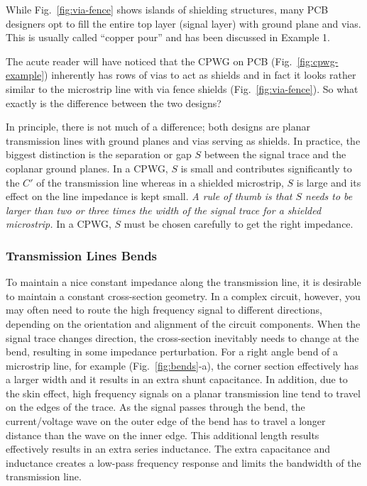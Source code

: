 \documentclass[12pt,letterpaper]{scrartcl}
\begin{document}
While Fig.~\ref{fig:via-fence} shows islands of shielding structures, many PCB designers opt to fill the entire top layer (signal layer) with ground plane and vias. This is usually called ``copper pour'' and has been discussed in Example 1. 

The acute reader will have noticed that the CPWG on PCB (Fig.~\ref{fig:cpwg-example}) inherently has rows of vias to act as shields and in fact it looks rather similar to the microstrip line with via fence shields (Fig.~\ref{fig:via-fence}). So what exactly is the difference between the two designs?

In principle, there is not much of a difference; both designs are planar transmission lines with ground planes and vias serving as shields. In practice, the biggest distinction is the separation or gap $S$ between the signal trace and the coplanar ground planes. In a CPWG, $S$ is small and contributes significantly to the $C'$ of the transmission line whereas in a shielded microstrip, $S$ is large and its effect on the line impedance is kept small. \textit{A rule of thumb is that $S$ needs to be larger than two or three times the width of the signal trace for a shielded microstrip.} In a CPWG, $S$ must be chosen carefully to get the right impedance. 

\subsubsection{Transmission Lines Bends}

To maintain a nice constant impedance along the transmission line, it is desirable to maintain a constant cross-section geometry. In a complex circuit, however, you may often need to route the high frequency signal to different directions, depending on the orientation and alignment of the circuit components. When the signal trace changes direction, the cross-section inevitably needs to change at the bend, resulting in some impedance perturbation. For a right angle bend of a microstrip line, for example (Fig.~\ref{fig:bends}-a), the corner section effectively has a larger width and it results in an extra shunt capacitance. In addition, due to the skin effect, high frequency signals on a planar transmission line tend to travel on the edges of the trace. As the signal passes through the bend, the current/voltage wave on the outer edge of the bend has to travel a longer distance than the wave on the inner edge. This additional length results effectively results in an extra series inductance. The extra capacitance and inductance creates a low-pass frequency response and limits the bandwidth of the transmission line. 
\end{document}
